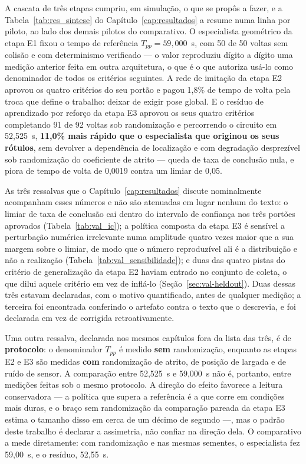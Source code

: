 A cascata de três etapas cumpriu, em simulação, o que se propôs a fazer, e a
Tabela~\ref{tab:res_sintese} do Capítulo~\ref{cap:resultados} a resume numa linha
por piloto, ao lado dos demais pilotos do comparativo. O especialista geométrico da etapa E1 fixou o tempo de referência
$T_{pp} = 59{,}000$~s, com 50 de 50 voltas sem colisão e com determinismo
verificado --- o valor reproduziu dígito a dígito uma medição anterior feita em
outra arquitetura, o que é o que autoriza usá-lo como denominador de todos os
critérios seguintes. A rede de imitação da etapa E2 aprovou os quatro critérios
do seu portão e pagou 1,8\% de tempo de volta pela troca que define o trabalho:
deixar de exigir pose global. E o resíduo de aprendizado por reforço da etapa E3
aprovou os seus quatro critérios completando 91 de 92 voltas sob randomização e
percorrendo o circuito em 52,525~s, \textbf{11,0\% mais rápido que o especialista
que originou os seus rótulos}, sem devolver a dependência de localização e com
degradação desprezível sob randomização do coeficiente de atrito --- queda de
taxa de conclusão nula, e piora de tempo de volta de 0,0019 contra um limiar de
0,05.

As três ressalvas que o Capítulo~\ref{cap:resultados} discute nominalmente
acompanham esses números e não são atenuadas em lugar nenhum do texto: o limiar
de taxa de conclusão cai dentro do intervalo de confiança nos três
portões aprovados (Tabela~\ref{tab:val_ic}); a política composta da etapa E3 é
sensível a perturbação numérica irrelevante numa amplitude quatro vezes maior que
a sua margem sobre o limiar, de modo que o número reproduzível ali é a
distribuição e não a realização (Tabela~\ref{tab:val_sensibilidade}); e duas das
quatro pistas do critério de generalização da etapa E2 haviam entrado no conjunto
de coleta, o que dilui aquele critério em vez de inflá-lo
(Seção~\ref{sec:val-heldout}). Duas dessas três estavam declaradas, com o motivo
quantificado, antes de qualquer medição; a terceira foi encontrada conferindo o
artefato contra o texto que o descrevia, e foi declarada em vez de corrigida
retroativamente.

Uma outra ressalva, declarada nos mesmos capítulos fora da lista das três, é de \textbf{protocolo}: o
denominador $T_{pp}$ é medido \textbf{sem} randomização, enquanto as etapas E2 e
E3 são medidas \textbf{com} randomização de atrito, de posição de largada e de
ruído de sensor. A comparação entre 52,525~s e 59,000~s não é, portanto, entre
medições feitas sob o mesmo protocolo. A direção do efeito favorece a leitura
conservadora --- a política que supera a referência é a que corre em condições
mais duras, e o braço sem randomização da comparação pareada da etapa E3 estima o
tamanho disso em cerca de um décimo de segundo ---, mas o padrão deste trabalho é
declarar a assimetria, não confiar na direção dela. O comparativo a mede
diretamente: com randomização e nas mesmas sementes, o especialista fez 59,00~s, e
o resíduo, 52,55~s.

